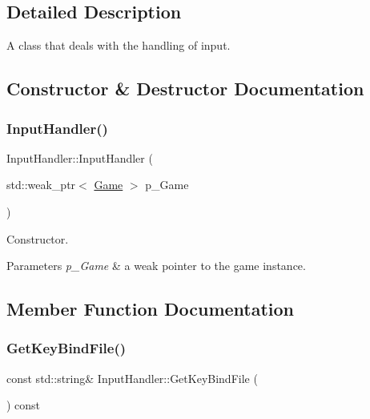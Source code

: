 \subsection{Detailed Description}
A class that deals with the handling of input. 

\subsection{Constructor \& Destructor Documentation}
\mbox{\label{class_input_handler_a304d7d05d09084e7bf16ed93b5c71dc9}} 
\subsubsection{\texorpdfstring{InputHandler()}{InputHandler()}}
{\footnotesize\ttfamily Input\+Handler\+::\+Input\+Handler (\begin{DoxyParamCaption}\item[{std\+::weak\+\_\+ptr$<$ \mbox{\hyperlink{class_game}{Game}} $>$}]{p\+\_\+\+Game }\end{DoxyParamCaption})}



Constructor. 


\begin{DoxyParams}{Parameters}
{\em p\+\_\+\+Game} & a weak pointer to the game instance. \\
\hline
\end{DoxyParams}


\subsection{Member Function Documentation}
\mbox{\label{class_input_handler_af157342dcffc46d1370450383304d85a}} 
\subsubsection{\texorpdfstring{GetKeyBindFile()}{GetKeyBindFile()}}
{\footnotesize\ttfamily const std\+::string\& Input\+Handler\+::\+Get\+Key\+Bind\+File (\begin{DoxyParamCaption}{ }\end{DoxyParamCaption}) const\hspace{0.3cm}{\ttfamily [inline]}}



